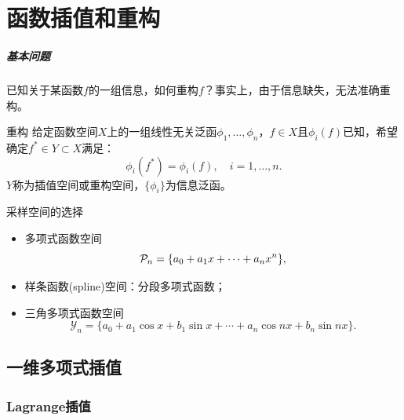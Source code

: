 \chapter{函数插值和重构}
\label{chap:interpolation}

\paragraph{基本问题}
已知关于某函数$f$的一组信息，如何重构$f$？事实上，由于信息缺失，无法准确重构。

\begin{definition}
    {重构}{}
    给定函数空间$X$上的一组线性无关泛函$\phi_1,\ldots,\phi_n$，$f\in X$且$\phi_i(f)$已知，希望确定$f^*\in Y\subset X$满足：
    \begin{equation}
        \phi_i(f^*)=\phi_i(f),\quad i=1,\ldots,n.
    \end{equation}
    $Y$称为插值空间或重构空间，$\{\phi_i\}$为信息泛函。
\end{definition}


\begin{example}
    {采样空间的选择}{}
    \begin{itemize}
        \item 多项式函数空间
        \[
            \mathcal P_n=\{a_0+a_1x+\cdots+a_nx^n\},
        \]
        \item 样条函数(spline)空间：分段多项式函数；
        \item 三角多项式函数空间
        \[
            \mathcal Y_n=\{a_0+a_1\cos x+b_1\sin x+\cdots+a_n\cos nx+b_n\sin nx\}.
        \]
    \end{itemize}
\end{example}

\section{一维多项式插值}
\label{sec:1-D polynomial interpolation}

\subsection{Lagrange插值}

